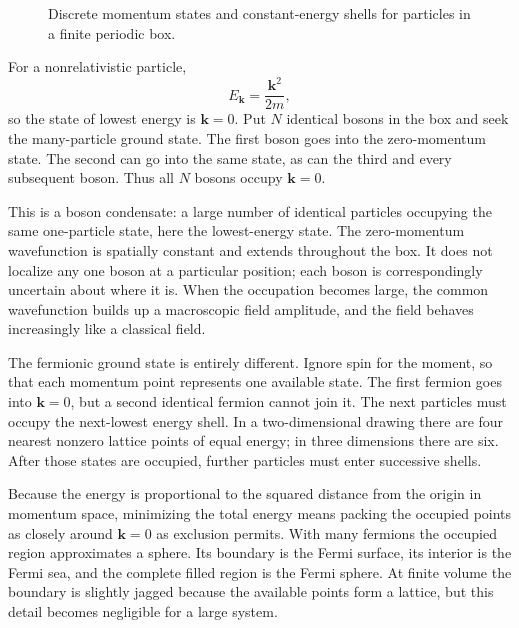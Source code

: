 \begin{figure}
\centering
{}
\caption{Discrete momentum states and constant-energy shells for particles in a finite periodic box.}
\end{figure}

For a nonrelativistic particle,
\begin{equation}
E_{\mathbf{k}}=\frac{\mathbf{k}^2}{2m},
\end{equation}
so the state of lowest energy is \(\mathbf{k}=0\). Put \(N\) identical bosons in the box and seek the many-particle ground state. The first boson goes into the zero-momentum state. The second can go into the same state, as can the third and every subsequent boson. Thus all \(N\) bosons occupy \(\mathbf{k}=0\).

This is a boson condensate: a large number of identical particles occupying the same one-particle state, here the lowest-energy state. The zero-momentum wavefunction is spatially constant and extends throughout the box. It does not localize any one boson at a particular position; each boson is correspondingly uncertain about where it is. When the occupation becomes large, the common wavefunction builds up a macroscopic field amplitude, and the field behaves increasingly like a classical field.

The fermionic ground state is entirely different. Ignore spin for the moment, so that each momentum point represents one available state. The first fermion goes into \(\mathbf{k}=0\), but a second identical fermion cannot join it. The next particles must occupy the next-lowest energy shell. In a two-dimensional drawing there are four nearest nonzero lattice points of equal energy; in three dimensions there are six. After those states are occupied, further particles must enter successive shells.

Because the energy is proportional to the squared distance from the origin in momentum space, minimizing the total energy means packing the occupied points as closely around \(\mathbf{k}=0\) as exclusion permits. With many fermions the occupied region approximates a sphere. Its boundary is the Fermi surface, its interior is the Fermi sea, and the complete filled region is the Fermi sphere. At finite volume the boundary is slightly jagged because the available points form a lattice, but this detail becomes negligible for a large system.

